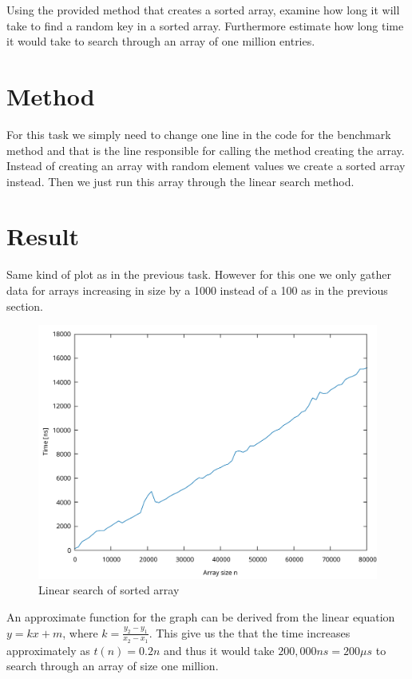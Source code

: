 \documentclass[a4paper,11pt]{article}
\begin{document}
Using the provided method that creates a sorted array, examine how long it will take to
find a random key in a sorted array. Furthermore estimate how long time it would
take to search through an array of one million entries.
\section*{Method}

For this task we simply need to change one line in the code for the benchmark method and
that is the line responsible for calling the method creating the array. Instead of creating
an array with random element values we create a sorted array instead. Then we just run this
array through the linear search method.

\section*{Result}

Same kind of plot as in the previous task. However for this one we only gather
data for arrays increasing in size by a 1000 instead of a 100 as in the previous
section.
\begin{figure}[h]
  \centering
  \includegraphics[width=\textwidth]{sortedLinearSearch.pdf}
  \caption{Linear search of sorted array}
  \label{fig:linearSorted}
\end{figure}
An approximate function for the graph can be derived from the linear equation $y=kx + m$,
where $k = \frac{y_2 - y_1}{x_2 - x_1}$. This give us the that the time increases approximately
as $t(n)=0.2n$ and thus it would take $200,000ns=200 \mu s$ to search through an array of size
one million.
\end{document}

